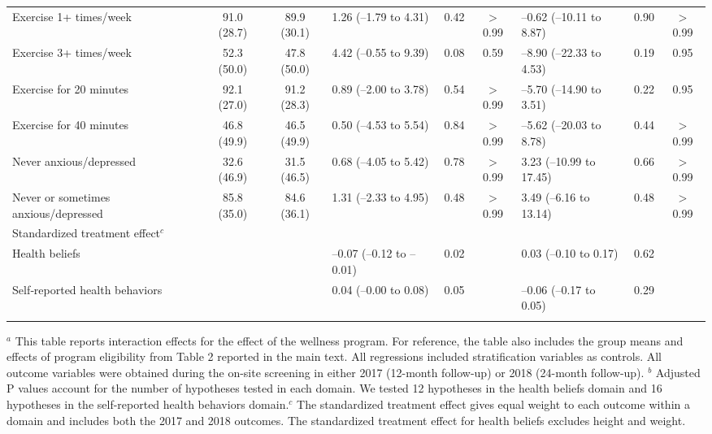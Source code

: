 \documentclass{article}
\begin{document}
\begin{landscape}
\begin{table}[tbp]
{\begin{tabularx}{\linewidth}{lCClCClCC}
\hspace{1em} Exercise 1+ times/week&91.0  (28.7)&89.9  (30.1)&1.26 (--1.79 to 4.31)&0.42&$>$0.99&--0.62 (--10.11 to 8.87)&0.90&$>$0.99 \tabularnewline
\hspace{1em} Exercise 3+ times/week&52.3  (50.0)&47.8  (50.0)&4.42 (--0.55 to 9.39)&0.08&0.59&--8.90 (--22.33 to 4.53)&0.19&0.95 \tabularnewline
\hspace{1em} Exercise for 20 minutes&92.1  (27.0)&91.2  (28.3)&0.89 (--2.00 to 3.78)&0.54&$>$0.99&--5.70 (--14.90 to 3.51)&0.22&0.95 \tabularnewline
\hspace{1em} Exercise for 40 minutes&46.8  (49.9)&46.5  (49.9)&0.50 (--4.53 to 5.54)&0.84&$>$0.99&--5.62 (--20.03 to 8.78)&0.44&$>$0.99 \tabularnewline
\hspace{1em} Never anxious/depressed&32.6  (46.9)&31.5  (46.5)&0.68 (--4.05 to 5.42)&0.78&$>$0.99&3.23 (--10.99 to 17.45)&0.66&$>$0.99 \tabularnewline
\hspace{1em} Never or sometimes anxious/depressed&85.8  (35.0)&84.6  (36.1)&1.31 (--2.33 to 4.95)&0.48&$>$0.99&3.49 (--6.16 to 13.14)&0.48&$>$0.99 \tabularnewline
Standardized treatment effect$^{c}$&&&&&&&& \tabularnewline
\hspace{1em} Health beliefs&&&--0.07 (--0.12 to --0.01)&0.02&&0.03 (--0.10 to 0.17)&0.62& \tabularnewline
\hspace{1em} Self‐reported health behaviors&&&0.04 (--0.00 to 0.08)&0.05&&--0.06 (--0.17 to 0.05)&0.29& \tabularnewline
\bottomrule \addlinespace[\belowrulesep]

\end{tabularx}
\begin{flushleft}
\tiny $^{a}$ This table reports interaction effects for the effect of the wellness program. For reference, the table also includes the group means and effects of program eligibility from Table 2 reported in the main text. All regressions included stratification variables as controls. All outcome variables were obtained during the on-site screening in either 2017 (12-month follow-up) or 2018 (24-month follow-up). \newline $^{b}$ Adjusted P values account for the number of hypotheses tested in each domain. We tested 12 hypotheses in the health beliefs domain and 16 hypotheses in the self-reported health behaviors domain.\newline $^{c}$ The standardized treatment effect gives equal weight to each outcome within a domain and includes both the 2017 and 2018 outcomes. The standardized treatment effect for health beliefs excludes height and weight.
\end{flushleft}
}
\end{table}
\end{landscape}
\end{document}
